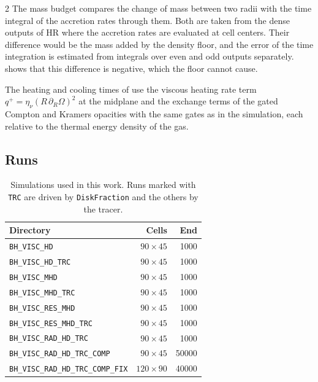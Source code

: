 \begin{multicols}{2}
	The mass budget compares the change of mass between two radii with the time integral of the accretion rates through them.
	Both are taken from the dense outputs of HR where the accretion rates are evaluated at cell centers. Their difference would
	be the mass added by the density floor, and the error of the time integration is estimated from integrals over even and odd
	outputs separately.  shows that this difference is negative, which the floor cannot cause.

	The heating and cooling times of  use the viscous heating rate term
	$q^+ = \eta_\nu \left(R \, \partial_R \Omega\right)^2$ at the midplane and the exchange terms of the gated Compton and Kramers
	opacities with the same gates as in the simulation, each relative to the thermal energy density of the gas.

	\subsection{Runs}
	\label{app:runs}

	\begin{table}[H]
		\centering
		\small
		\caption{Simulations used in this work. Runs marked with \texttt{TRC} are driven by \texttt{DiskFraction} and the others by the tracer.}
		\begin{tabular}{l r r}
			\toprule
			Directory & Cells & End \\
			\midrule
			\verb|BH_VISC_HD|                  & $90 \times 45$  & \num{1000} \\
			\verb|BH_VISC_HD_TRC|              & $90 \times 45$  & \num{1000} \\
			\verb|BH_VISC_MHD|                 & $90 \times 45$  & \num{1000} \\
			\verb|BH_VISC_MHD_TRC|             & $90 \times 45$  & \num{1000} \\
			\verb|BH_VISC_RES_MHD|             & $90 \times 45$  & \num{1000} \\
			\verb|BH_VISC_RES_MHD_TRC|         & $90 \times 45$  & \num{1000} \\
			\verb|BH_VISC_RAD_HD_TRC|          & $90 \times 45$  & \num{1000} \\
			\verb|BH_VISC_RAD_HD_TRC_COMP|     & $90 \times 45$  & \num{50000} \\
			\verb|BH_VISC_RAD_HD_TRC_COMP_FIX| & $120 \times 90$ & \num{40000} \\
			\bottomrule
		\end{tabular}
		\label{tab:dirs}
	\end{table}


\end{multicols}
